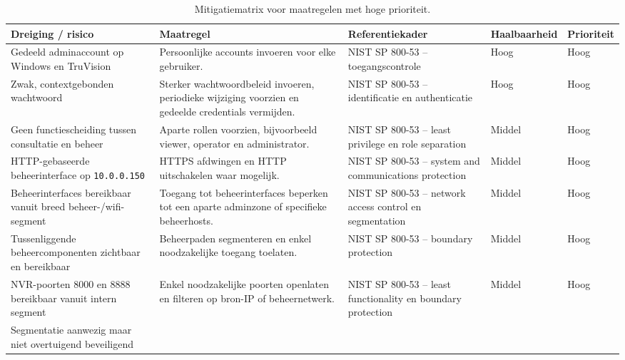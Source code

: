 \begin{table}[H]
    \centering
    \scriptsize
    \caption[Mitigatiematrix met hoge prioriteit]{Mitigatiematrix voor maatregelen met hoge prioriteit.}
    \label{tab:app-mitigaties-hoog}
    \begin{tabularx}{\textwidth}{p{}X p{}p{}p{}}
        \hline
        \textbf{Dreiging / risico} & \textbf{Maatregel} & \textbf{Referentiekader} & \textbf{Haalbaarheid} & \textbf{Prioriteit} \\
        \hline
        Gedeeld adminaccount op Windows en TruVision &
        Persoonlijke accounts invoeren voor elke gebruiker. &
        NIST SP 800-53 -- toegangscontrole &
        Hoog & Hoog \\
        \hline
        Zwak, contextgebonden wachtwoord &
        Sterker wachtwoordbeleid invoeren, periodieke wijziging voorzien en gedeelde credentials vermijden. &
        NIST SP 800-53 -- identificatie en authenticatie &
        Hoog & Hoog \\
        \hline
        Geen functiescheiding tussen consultatie en beheer &
        Aparte rollen voorzien, bijvoorbeeld viewer, operator en administrator. &
        NIST SP 800-53 -- least privilege en role separation &
        Middel & Hoog \\
        \hline
        HTTP-gebaseerde beheerinterface op \texttt{10.0.0.150} &
        HTTPS afdwingen en HTTP uitschakelen waar mogelijk. &
        NIST SP 800-53 -- system and communications protection &
        Middel & Hoog \\
        \hline
        Beheerinterfaces bereikbaar vanuit breed beheer-/wifi-segment &
        Toegang tot beheerinterfaces beperken tot een aparte adminzone of specifieke beheerhosts. &
        NIST SP 800-53 -- network access control en segmentation &
        Middel & Hoog \\
        \hline
        Tussenliggende beheercomponenten zichtbaar en bereikbaar &
        Beheerpaden segmenteren en enkel noodzakelijke toegang toelaten. &
        NIST SP 800-53 -- boundary protection &
        Middel & Hoog \\
        \hline
        NVR-poorten 8000 en 8888 bereikbaar vanuit intern segment &
        Enkel noodzakelijke poorten openlaten en filteren op bron-IP of beheernetwerk. &
        NIST SP 800-53 -- least functionality en boundary protection &
        Middel & Hoog \\
        \hline
        Segmentatie aanwezig maar niet overtuigend beveiligend &

\end{tabularx}
\end{table}
